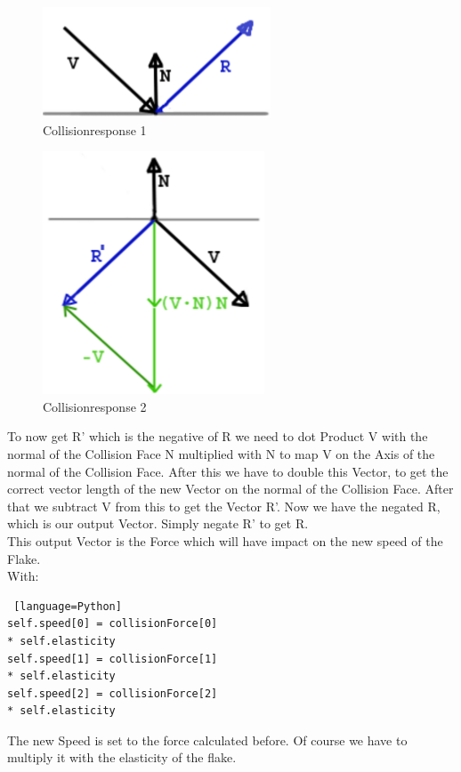 \documentclass{sig-alternate-05-2015}
\begin{document}
\begin{figure}
  \begin{center}
\includegraphics[scale=0.5]{CollisionResponse1Terrain.png}
  \end{center}
  \caption{Collisionresponse 1}
\end{figure}
\begin{figure}
  \begin{center}
\includegraphics[scale=0.5]{CollisionResponse2Terrain.png}
  \end{center}
  \caption{Collisionresponse 2}
\end{figure}

 To now get R’ which is the negative of R we need to dot Product V with the normal of the Collision Face N multiplied with N to map V on the Axis of the normal of the Collision Face. After this we have to double this Vector, to get the correct vector length of the new Vector on the normal of the Collision Face. After that we subtract V from this to get the Vector R’. Now we have the negated R, which is our output Vector. Simply negate R’ to get R. \\
This output Vector is the Force which will have impact on the new speed of the Flake. \\
With: 
\begin{lstlisting} [language=Python]
self.speed[0] = collisionForce[0] 
* self.elasticity
self.speed[1] = collisionForce[1] 
* self.elasticity
self.speed[2] = collisionForce[2] 
* self.elasticity
\end{lstlisting}
The new Speed is set to the force calculated before. Of course we have to multiply it with the elasticity of the flake. \\
\\
\end{document}
